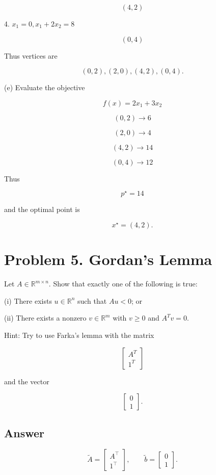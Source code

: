 \documentclass[
	12pt,
]{fphw}
\begin{document}
\[
(4,2)
\]

4. \(x_1=0, x_1+2x_2=8\)

\[
(0,4)
\]

Thus vertices are

\[
(0,2), (2,0), (4,2), (0,4).
\]

\bigskip

(e) Evaluate the objective

\[
f(x)=2x_1+3x_2
\]

\[
(0,2) \rightarrow 6
\]

\[
(2,0) \rightarrow 4
\]

\[
(4,2) \rightarrow 14
\]

\[
(0,4) \rightarrow 12
\]

Thus

\[
p^\star = 14
\]

and the optimal point is

\[
x^\star = (4,2).
\]


\newpage
\section*{Problem 5. Gordan’s Lemma}

Let \(A \in \mathbb{R}^{m\times n}\). Show that exactly one of the following is true:

(i) There exists \(u \in \mathbb{R}^n\) such that \(Au < 0\); or

(ii) There exists a nonzero \(v \in \mathbb{R}^m\) with \(v \ge 0\) and \(A^T v = 0\).

Hint: Try to use Farka’s lemma with the matrix

\[
\begin{bmatrix}
A^T \\
1^T
\end{bmatrix}
\]

and the vector

\[
\begin{bmatrix}
0 \\
1
\end{bmatrix}.
\]

\subsection*{Answer}

\[
\tilde{A} =
\begin{bmatrix}
A^\top \\
1^\top
\end{bmatrix},
\qquad
\tilde{b} =
\begin{bmatrix}
0 \\
1
\end{bmatrix}.
\]
\end{document}
